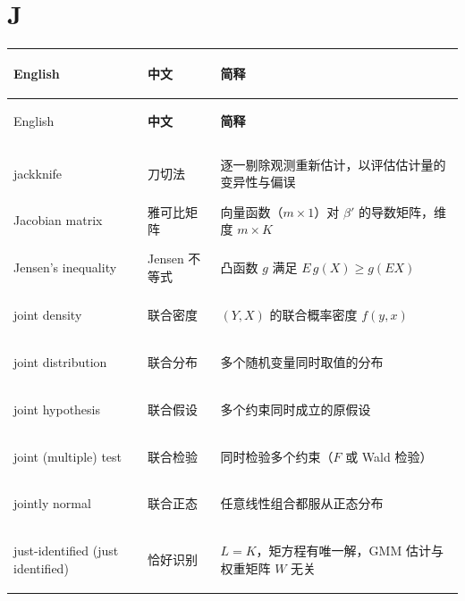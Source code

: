 \par{}\ifdim\dimexpr\pagegoal-\pagetotal\relax<16\baselineskip\newpage\fi
\section*{J}
\begin{longtable}{@{}>{\bfseries\boldmath\raggedright\arraybackslash}p{4.6cm}>{\raggedright\arraybackslash}p{3.2cm}>{\raggedright\arraybackslash}p{\dimexpr\textwidth-7.8cm-4\tabcolsep\relax}@{}}
\toprule
English & \textbf{中文} & \textbf{简释}\\
\midrule
\endfirsthead
\toprule
English & \textbf{中文} & \textbf{简释}\\
\midrule
\endhead
\midrule
\multicolumn{3}{r@{}}{\footnotesize\itshape （续下页）}\\
\endfoot
\bottomrule
\endlastfoot
jackknife & 刀切法 & 逐一剔除观测重新估计，以评估估计量的变异性与偏误 \\
Jacobian matrix & 雅可比矩阵 & 向量函数（$m\times1$）对 $\beta'$ 的导数矩阵，维度 $m\times K$ \\
Jensen's inequality & Jensen 不等式 & 凸函数 $g$ 满足 $E\,g(X)\ge g(EX)$ \\
joint density & 联合密度 & $(Y,X)$ 的联合概率密度 $f(y,x)$ \\
joint distribution & 联合分布 & 多个随机变量同时取值的分布 \\
joint hypothesis & 联合假设 & 多个约束同时成立的原假设 \\
joint (multiple) test & 联合检验 & 同时检验多个约束（$F$ 或 Wald 检验） \\
jointly normal & 联合正态 & 任意线性组合都服从正态分布 \\
just-identified (just identified) & 恰好识别 & $L=K$，矩方程有唯一解，GMM 估计与权重矩阵 $W$ 无关 \\
\end{longtable}

\par{}\ifdim\dimexpr\pagegoal-\pagetotal\relax<16\baselineskip\newpage\fi
